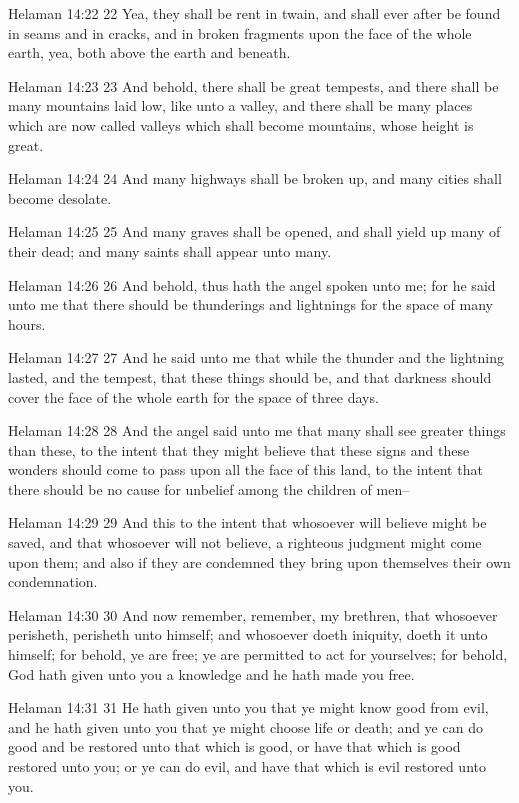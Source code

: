 Helaman 14:22
 22 Yea, they shall be rent in twain, and shall ever after be
found in seams and in cracks, and in broken fragments upon the
face of the whole earth, yea, both above the earth and beneath.

Helaman 14:23
 23 And behold, there shall be great tempests, and there shall be
many mountains laid low, like unto a valley, and there shall be
many places which are now called valleys which shall become
mountains, whose height is great.

Helaman 14:24
 24 And many highways shall be broken up, and many cities shall
become desolate.

Helaman 14:25
 25 And many graves shall be opened, and shall yield up many of
their dead; and many saints shall appear unto many.

Helaman 14:26
 26 And behold, thus hath the angel spoken unto me; for he said
unto me that there should be thunderings and lightnings for the
space of many hours.

Helaman 14:27
 27 And he said unto me that while the thunder and the lightning
lasted, and the tempest, that these things should be, and that
darkness should cover the face of the whole earth for the space
of three days.

Helaman 14:28
 28 And the angel said unto me that many shall see greater things
than these, to the intent that they might believe that these
signs and these wonders should come to pass upon all the face of
this land, to the intent that there should be no cause for
unbelief among the children of men--

Helaman 14:29
 29 And this to the intent that whosoever will believe might be
saved, and that whosoever will not believe, a righteous judgment
might come upon them; and also if they are condemned they bring
upon themselves their own condemnation.

Helaman 14:30
 30 And now remember, remember, my brethren, that whosoever
perisheth, perisheth unto himself; and whosoever doeth iniquity,
doeth it unto himself; for behold, ye are free; ye are permitted
to act for yourselves; for behold, God hath given unto you a
knowledge and he hath made you free.

Helaman 14:31
 31 He hath given unto you that ye might know good from evil, and
he hath given unto you that ye might choose life or death; and ye
can do good and be restored unto that which is good, or have that
which is good restored unto you; or ye can do evil, and have that
which is evil restored unto you.

